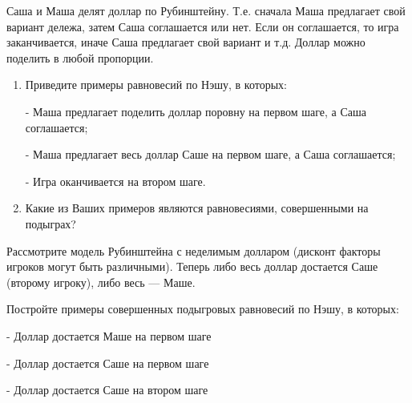 \begin{problem}
Саша и Маша делят доллар по Рубинштейну. Т.е. сначала Маша предлагает свой вариант дележа, затем Саша соглашается или нет. Если он соглашается, то игра заканчивается,  иначе Саша предлагает свой вариант и т.д.
 Доллар можно поделить в любой пропорции.\par

\begin{enumerate}
\item  Приведите примеры равновесий по Нэшу, в которых:\par
- Маша предлагает поделить доллар поровну на первом шаге, а Саша соглашается;\par
- Маша предлагает весь доллар Саше на первом шаге, а Саша соглашается;\par
- Игра оканчивается на втором шаге.\par
\item Какие из Ваших примеров являются равновесиями, совершенными на подыграх?
\end{enumerate}


\begin{sol}

\end{sol}
\end{problem}



\begin{problem}\par
\begin{source} \cite{binmore:fg} \end{source}
Рассмотрите модель Рубинштейна с неделимым долларом (дисконт факторы игроков могут быть различными). Теперь либо весь доллар достается Саше (второму игроку), либо весь — Маше.\par
 Постройте примеры совершенных подыгровых равновесий по Нэшу, в которых:\par
- Доллар достается Маше на первом шаге\par
- Доллар достается Саше на первом шаге\par
- Доллар достается Саше на втором шаге\par



\begin{sol}

\end{sol}
\end{problem}



